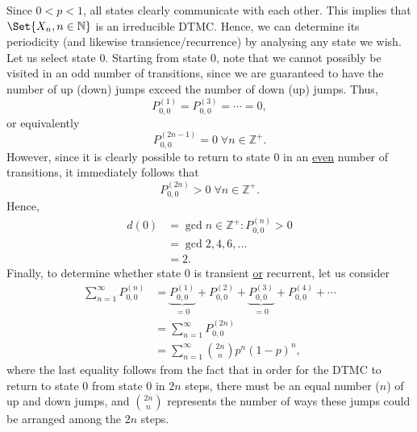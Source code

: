 \begin{Example}
    Since $ 0<p<1 $, all states clearly communicate with
    each other. This implies that $ \Set{X_n,n\in\mathbb{N}} $
    is an irreducible DTMC\@. Hence, we can determine its
    periodicity (and likewise transience/recurrence) by analysing
    any state we wish. Let us select state $0$. Starting from state $0$,
    note that we cannot possibly be visited in an odd number of transitions,
    since we are guaranteed to have the number of up (down) jumps
    exceed the number of down (up) jumps. Thus,
    \[ P_{0,0}^{(1)}=P_{0,0}^{(3)}=\cdots=0, \]
    or equivalently
    \[ P_{0,0}^{(2n-1)}=0\;\forall n\in\mathbb{Z}^+. \]
    However, since it is clearly possible to return to state $ 0 $ in an \underline{even}
    number of transitions, it immediately follows that
    \[ P_{0,0}^{(2n)}>0\;\forall n\in\mathbb{Z}^+. \]
    Hence,
    \begin{align*}
        d(0)
         & =\gcd{n\in\mathbb{Z}^+:P_{0,0}^{(n)}>0} \\
         & =\gcd{2,4,6,\ldots}                     \\
         & =2.
    \end{align*}
    Finally, to determine whether state $ 0 $ is transient \underline{or}
    recurrent, let us consider
    \begin{align*}
        \sum_{n=1}^{\infty} P_{0,0}^{(n)}
         & =\underbrace{P_{0,0}^{(1)}}_{=0}+P_{0,0}^{(2)}+\underbrace{P_{0,0}^{(3)}}_{=0}+P_{0,0}^{(4)}+\cdots \\
         & =\sum_{n=1}^{\infty} P_{0,0}^{(2n)}                                                                 \\
         & =\sum_{n=1}^{\infty} \binom{2n}{n}p^n(1-p)^{n},
    \end{align*}
    where the last equality follows from the fact that in order for
    the DTMC to return to state $ 0 $ from state $ 0 $ in $ 2n $ steps,
    there must be an equal number ($ n $) of up and down jumps,
    and $ \binom{2n}{n} $ represents the number of ways these jumps could be arranged
    among the $ 2n $ steps.


\end{Example}
